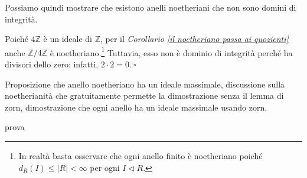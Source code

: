 \noindent Possiamo quindi mostrare che esistono anelli noetheriani che non sono domini di integrità.

\begin{exm}
  Poiché $4\mathbb{Z}$ è un ideale di $\mathbb{Z}$, per il \emph{Corollario \ref{il noetheriano passa ai quozienti}} 
  anche $\mathbb{Z}/4\mathbb{Z}$ è noetheriano.\footnote{In realtà basta osservare che ogni anello finito è noetheriano 
  poiché $d_R(I)\leq |R|<\infty$ per ogni $I\lhd R$.} 
  Tuttavia, esso non è dominio di integrità perché ha divisori dello zero: infatti, $2\cdot 2=0. \ \square$
\end{exm}

\noindent Proposizione che anello noetheriano ha un ideale massimale, discussione sulla noetherianità che gratuitamente 
permette la dimostrazione senza il lemma di zorn, dimostrazione che ogni anello ha un ideale massimale usando zorn.

\begin{obs}
prova
\end{obs}
